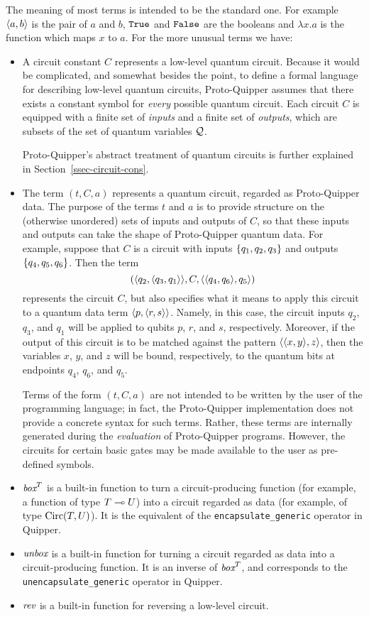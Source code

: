 \documentclass[twoside]{article}
\begin{document}
The meaning of most terms is intended to be the standard one. For
example $\langle a,b\rangle$ is the pair of $a$ and $b$, $\texttt{True}$ and $\texttt{False}$ are
the booleans and $\lambda x.a$ is the function which maps $x$ to
$a$. For the more unusual terms we have:
\begin{itemize}
\item A circuit constant $C$ represents a low-level quantum circuit.
  Because it would be complicated, and somewhat besides the point, to
  define a formal language for describing low-level quantum circuits,
  Proto-Quipper assumes that there exists a constant symbol for {\em
    every} possible quantum circuit. Each circuit $C$ is equipped with
  a finite set of {\em inputs} and a finite set of {\em outputs},
  which are subsets of the set of quantum variables $\mathcal{Q}$.

  Proto-Quipper's abstract treatment of quantum circuits is further
  explained in Section~\ref{ssec-circuit-cons}.

\item The term $(t,C,a)$ represents a quantum circuit, regarded as
  Proto-Quipper data. The purpose of the terms $t$ and $a$ is to
  provide structure on the (otherwise unordered) sets of inputs and
  outputs of $C$, so that these inputs and outputs can take the shape
  of Proto-Quipper quantum data.  For example, suppose that $C$ is a
  circuit with inputs $\{q_1,q_2,q_3\}$ and outputs
  $\{q_4,q_5,q_6\}$. Then the term
  \[ (\langle q_2,\langle q_3,q_1\rangle\rangle, C, \langle\langle q_4,q_6\rangle,q_5\rangle)
  \] 
  represents the circuit $C$, but also specifies what it means to
  apply this circuit to a quantum data term $\langle p,\langle r,s\rangle\rangle$. Namely,
  in this case, the circuit inputs $q_2$, $q_3$, and $q_1$ will be
  applied to qubits $p$, $r$, and $s$, respectively.  Moreover, if the
  output of this circuit is to be matched against the pattern
  $\langle\langle x,y\rangle,z\rangle$, then the variables $x$, $y$, and $z$ will be bound,
  respectively, to the quantum bits at endpoints $q_4$, $q_6$, and
  $q_5$.

  Terms of the form $(t,C,a)$ are not intended to be written by the
  user of the programming language; in fact, the Proto-Quipper
  implementation does not provide a concrete syntax for such
  terms. Rather, these terms are internally generated during the {\em
    evaluation} of Proto-Quipper programs. However, the circuits for
  certain basic gates may be made available to the user as pre-defined
  symbols.
\item $\mathop{\textit{box}}\nolimits^T$ is a built-in function to turn a circuit-producing
  function (for example, a function of type $T\multimap U$) into a
  circuit regarded as data (for example, of type $\mathop{\textrm{Circ}}\nolimits(T,U)$). It is
  the equivalent of the {\tt encapsulate\_generic} operator in Quipper.
\item $\mathop{\textit{unbox}}\nolimits$ is a built-in function for turning a circuit regarded
  as data into a circuit-producing function. It is an inverse of
  $\mathop{\textit{box}}\nolimits^T$, and corresponds to the {\tt unencapsulate\_generic}
  operator in Quipper.
\item $\mathop{\textit{rev}}\nolimits$ is a built-in function for reversing a low-level
  circuit.
\end{itemize}
\end{document}
